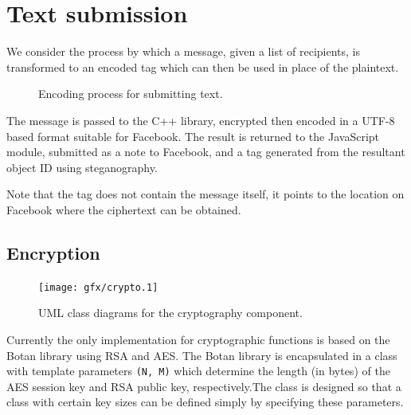     
\FloatBarrier
\section{Text submission}

We consider the process by which a message, given a list of recipients, is transformed to an encoded tag which can then be used in place of the plaintext. 

    \begin{figure}[tb]
        \begin{center}
                
            \caption{Encoding process for submitting text.}
            \label{tikz:text}
        \end{center}
    \end{figure}

The message is passed to the C++ library, encrypted then encoded in a UTF-8 based format suitable for Facebook. The result is returned to the JavaScript module, submitted as a note to Facebook, and a tag generated from the resultant object ID using steganography.

Note that the tag does not contain the message itself, it points to the location on Facebook where the ciphertext can be obtained.

\subsection{Encryption}

    \begin{figure}[tb]
        \begin{center}
                \texttt{[image: gfx/crypto.1]}
            \caption{UML class diagrams for the cryptography component.}
            \label{uml:crypto}
        \end{center}
    \end{figure}
    
Currently the only implementation for cryptographic functions is based on the Botan library using RSA and AES. The Botan library is encapsulated in a class with template parameters {\tt (N, M)} which determine the length (in bytes) of the AES session key and RSA public key, respectively.The class is designed so that a class with certain key sizes can be defined simply by specifying these parameters.
    
